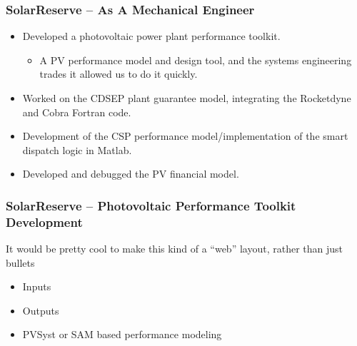 \documentclass[aspectratio=169]{beamer}
\begin{document}
\begin{frame}
  \frametitle{SolarReserve -- As A Mechanical Engineer}
  \begin{itemize}
  \item Developed a photovoltaic power plant performance toolkit.
    \begin{itemize}
    \item A PV performance model and design tool, and the systems
      engineering trades it allowed us to do it quickly.
    \end{itemize}
  \item Worked on the CDSEP plant guarantee model, integrating the
    Rocketdyne and Cobra Fortran code.
  \item Development of the CSP performance model/implementation of the
    smart dispatch logic in Matlab.
  \item Developed and debugged the PV financial model.
  \end{itemize}
\end{frame}

\begin{frame}
  \frametitle{SolarReserve -- Photovoltaic Performance Toolkit Development}
  It would be pretty cool to make this kind of a ``web'' layout, rather than just bullets
  \begin{itemize}
  \item Inputs
  \item Outputs
  \item PVSyst or SAM based performance modeling
  \end{itemize}
\end{frame}
\end{document}
